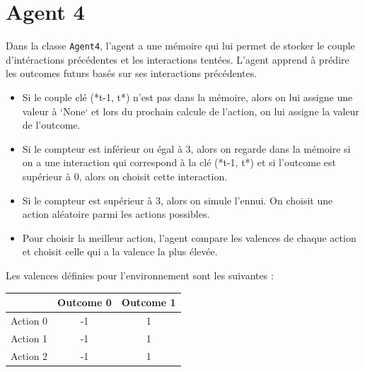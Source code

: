 \documentclass[a4paper, 12pt]{article}
\begin{document}
\newpage

\section{Agent 4}

\hspace*{\parindent} Dans la classe \texttt{Agent4}, l'agent a une mémoire qui lui permet de stocker le couple d'intéractions précédentes et les interactions tentées. L'agent apprend à prédire les outcomes futurs basés sur ses interactions précédentes.

\begin{itemize}
    \item Si le couple clé (*t-1, t*) n'est pas dans la mémoire, alors on lui assigne une valeur à `None` et lors du prochain calcule de l'action, on lui assigne la valeur de l'outcome.
    \item Si le compteur est inférieur ou égal à 3, alors on regarde dans la mémoire si on a une interaction qui correspond à la clé (*t-1, t*) et si l'outcome est supérieur à 0, alors on choisit cette interaction.
    \item Si le compteur est supérieur à 3, alors on simule l'ennui. On choisit une action aléatoire parmi les actions possibles.
    \item Pour choisir la meilleur action, l'agent compare les valences de chaque action et choisit celle qui a la valence la plus élevée.
\end{itemize}

Les valences définies pour l'environnement sont les suivantes :

\begin{center}
\begin{tabular}{|c|c|c|}
\hline
& Outcome 0 & Outcome 1 \\
\hline
Action 0 & -1 & 1 \\
\hline
Action 1 & -1 & 1 \\
\hline
Action 2 & -1 & 1 \\
\hline
\end{tabular}
\end{center}
\end{document}
